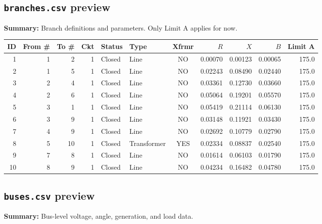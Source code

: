 \documentclass[11pt]{article}
\begin{document}
\subsection{\texttt{branches.csv} preview}\label{app:branches-preview}
\textbf{Summary:} Branch definitions and parameters. Only Limit A applies for now.

\scriptsize
\begin{longtable}{@{}rrrrllcrrrr@{}}
\toprule
ID & From \# & To \# & Ckt & Status & Type & Xfrmr & $R$ & $X$ & $B$ & Limit A \\
\midrule
\endhead
1  & 1 & 2  & 1 & Closed & Line        & NO  & 0.00070 & 0.00123 & 0.00065 & 175.0 \\
2  & 1 & 5  & 1 & Closed & Line        & NO  & 0.02243 & 0.08490 & 0.02440 & 175.0 \\
3  & 2 & 4  & 1 & Closed & Line        & NO  & 0.03361 & 0.12730 & 0.03660 & 175.0 \\
4  & 2 & 6  & 1 & Closed & Line        & NO  & 0.05064 & 0.19201 & 0.05570 & 175.0 \\
5  & 3 & 1  & 1 & Closed & Line        & NO  & 0.05419 & 0.21114 & 0.06130 & 175.0 \\
6  & 3 & 9  & 1 & Closed & Line        & NO  & 0.03148 & 0.11921 & 0.03430 & 175.0 \\
7  & 4 & 9  & 1 & Closed & Line        & NO  & 0.02692 & 0.10779 & 0.02790 & 175.0 \\
8  & 5 & 10 & 1 & Closed & Transformer & YES & 0.02334 & 0.08837 & 0.02540 & 175.0 \\
9  & 7 & 8  & 1 & Closed & Line        & NO  & 0.01614 & 0.06103 & 0.01790 & 175.0 \\
10 & 8 & 9  & 1 & Closed & Line        & NO  & 0.04234 & 0.16482 & 0.04780 & 175.0 \\
\bottomrule
\end{longtable}
\normalsize

\subsection{\texttt{buses.csv} preview}
\textbf{Summary:} Bus-level voltage, angle, generation, and load data.
\end{document}
